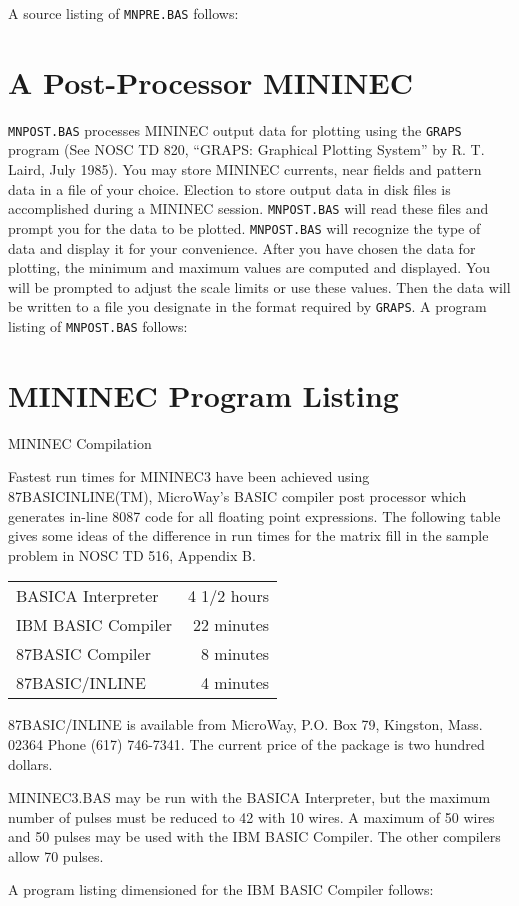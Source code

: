 \documentclass[12pt]{article}
\begin{document}
A source listing of \verb+MNPRE.BAS+ follows:

\section{A Post-Processor MININEC}
\label{app-B}
\verb+MNPOST.BAS+ processes MININEC output data for plotting using the
\verb+GRAPS+ program (See NOSC TD 820, ``GRAPS: Graphical Plotting
System'' by R. T. Laird, July 1985). You may store MININEC currents,
near fields and pattern data in a file of your choice. Election to store
output data in disk files is accomplished during a MININEC session.
\verb+MNPOST.BAS+ will read these files and prompt you for the data to
be plotted. \verb+MNPOST.BAS+ will recognize the type of data and
display it for your convenience. After you have chosen the data for
plotting, the minimum and maximum values are computed and displayed. You
will be prompted to adjust the scale limits or use these values. Then
the data will be written to a file you designate in the format required
by \verb+GRAPS+. A program listing of \verb+MNPOST.BAS+ follows:

\section{MININEC Program Listing}
MININEC Compilation

\newcommand{\slashbreak}{\discretionary{/}{}{/}}
Fastest run times for MININEC3 have been achieved using
87BASIC\slashbreak{}INLINE(TM), MicroWay's BASIC compiler post processor
which generates in-line 8087 code for all floating point expressions.
The following table gives some ideas of the difference in run times for
the matrix fill in the sample problem in NOSC TD 516, Appendix B.

\begin{table}[ht]
\begin{tabular}{lr}
BASICA Interpreter & 4 1/2 hours \\
IBM BASIC Compiler & 22 minutes  \\
87BASIC Compiler   &  8 minutes  \\
87BASIC/INLINE     &  4 minutes  \\
\end{tabular}
\end{table}

87BASIC/INLINE is available from MicroWay, P.O. Box 79, Kingston, Mass.
02364 Phone (617) 746-7341. The current price of the package is two
hundred dollars.

MININEC3.BAS may be run with the BASICA Interpreter, but the maximum
number of pulses must be reduced to 42 with 10 wires. A maximum of 50
wires and 50 pulses may be used with the IBM BASIC Compiler. The other
compilers allow 70 pulses.

A program listing dimensioned for the IBM BASIC Compiler follows:
\end{document}

